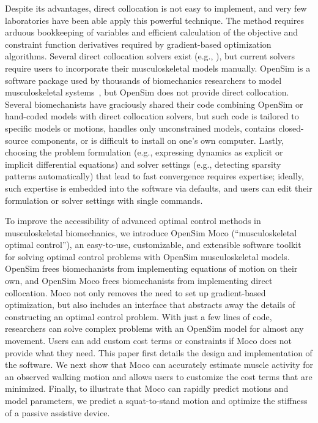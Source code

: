 \documentclass[10pt,letterpaper]{article}
\begin{document}
Despite its advantages, direct collocation is not easy to implement, and very few laboratories have been able apply this powerful technique. The method requires arduous bookkeeping of variables and efficient calculation of the objective and constraint function derivatives required by gradient-based optimization algorithms. Several direct collocation solvers exist (e.g., \cite{Becerra:2010,Patterson:2014}), but current solvers require users to incorporate their musculoskeletal models manually. OpenSim is a software package used by thousands of biomechanics researchers to model musculoskeletal systems~\cite{Delp:2007ij,Seth:2018gg,Sherman:2011byc}, but OpenSim does not provide direct collocation. Several biomechanists have graciously shared their code combining OpenSim or hand-coded models with direct collocation solvers, but such code is tailored to specific models or motions, handles only unconstrained models, contains closed-source components, or is difficult to install on one's own computer. Lastly, choosing the problem formulation (e.g., expressing dynamics as explicit or implicit differential equations) and solver settings (e.g., detecting sparsity patterns automatically) that lead to fast convergence requires expertise; ideally, such expertise is embedded into the software via defaults, and users can edit their formulation or solver settings with single commands.

To improve the accessibility of advanced optimal control methods in musculoskeletal biomechanics, we introduce OpenSim Moco (``musculoskeletal optimal control''), an easy-to-use, customizable, and extensible software toolkit for solving optimal control problems with OpenSim musculoskeletal models. OpenSim frees biomechanists from implementing equations of motion on their own, and OpenSim Moco frees biomechanists from implementing direct collocation. Moco not only removes the need to set up gradient-based optimization, but also includes an interface that abstracts away the details of constructing an optimal control problem. With just a few lines of code, researchers can solve complex problems with an OpenSim model for almost any movement. Users can add custom cost terms or constraints if Moco does not provide what they need. This paper first details the design and implementation of the software. We next show that Moco can accurately estimate muscle activity for an observed walking motion and allows users to customize the cost terms that are minimized. Finally, to illustrate that Moco can rapidly predict motions and model parameters, we predict a squat-to-stand motion and optimize the stiffness of a passive assistive device.
\end{document}
